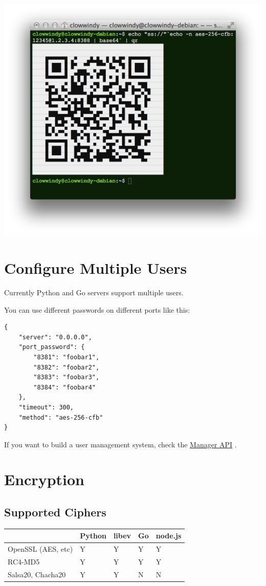 \documentclass[11pt,a4paper]{sphinxmanual}
\begin{document}
\includegraphics[keepaspectratio,max width=0.95\linewidth]{images/6a41d15a-51e1-11e4-801a-424b5add2009.png}




\label{sec:cmu}
\section{Configure Multiple Users}
\label{sec-5-3}
Currently Python and Go servers support multiple users.

You can use different passwords on different ports like this:

\begin{verbatim}
{
    "server": "0.0.0.0",
    "port_password": {
        "8381": "foobar1",
        "8382": "foobar2",
        "8383": "foobar3",
        "8384": "foobar4"
    },
    "timeout": 300,
    "method": "aes-256-cfb"
}
\end{verbatim}

If you want to build a user management system, check the \hyperref[sec:manage_multiple_users]{Manager API} .

\section{Encryption}
\label{sec-5-4}
\subsection{Supported Ciphers}
\label{sec-5-4-1}
\begin{center}
\begin{tabular}{lllll}
\toprule
 & Python & libev & Go & node.js\\
\midrule
OpenSSL (AES, etc) & Y & Y & Y & Y\\
RC4-MD5 & Y & Y & Y & Y\\
Salsa20, Chacha20 & Y & Y & N & N\\
\bottomrule
\end{tabular}
\end{center}
\end{document}

